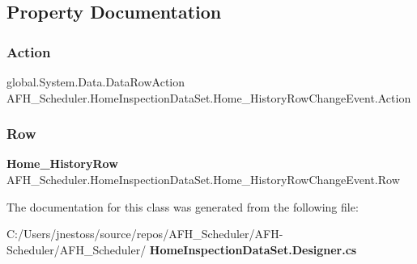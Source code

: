 \subsection{Property Documentation}
\mbox{\label{class_a_f_h___scheduler_1_1_home_inspection_data_set_1_1_home___history_row_change_event_af7ede047079ba0491b4b10009ba18158}} 
\subsubsection{Action}
{\footnotesize\ttfamily global.\+System.\+Data.\+Data\+Row\+Action A\+F\+H\+\_\+\+Scheduler.\+Home\+Inspection\+Data\+Set.\+Home\+\_\+\+History\+Row\+Change\+Event.\+Action\hspace{0.3cm}{\ttfamily [get]}}

\mbox{\label{class_a_f_h___scheduler_1_1_home_inspection_data_set_1_1_home___history_row_change_event_aadbeefffdcbb06829b63291636323cc5}} 
\subsubsection{Row}
{\footnotesize\ttfamily \textbf{ Home\+\_\+\+History\+Row} A\+F\+H\+\_\+\+Scheduler.\+Home\+Inspection\+Data\+Set.\+Home\+\_\+\+History\+Row\+Change\+Event.\+Row\hspace{0.3cm}{\ttfamily [get]}}



The documentation for this class was generated from the following file\+:\begin{DoxyCompactItemize}
\item 
C\+:/\+Users/jnestoss/source/repos/\+A\+F\+H\+\_\+\+Scheduler/\+A\+F\+H-\/\+Scheduler/\+A\+F\+H\+\_\+\+Scheduler/\textbf{ Home\+Inspection\+Data\+Set.\+Designer.\+cs}\end{DoxyCompactItemize}
